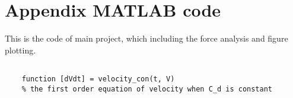 \documentclass[main.tex]{subfiles}
\begin{document}
\appendix
\section*{Appendix MATLAB code}

This is the code of main project, which including the force analysis and figure plotting.

\begin{lstlisting}

    function [dVdt] = velocity_con(t, V)
    % the first order equation of velocity when C_d is constant

\end{lstlisting}
\end{document}
